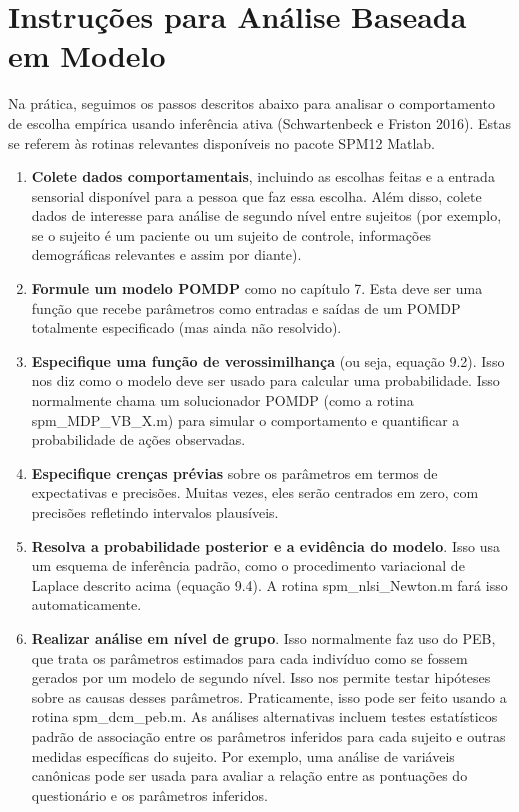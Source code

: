 \documentclass[
  12pt,
]{book}
\begin{document}
\hypertarget{instruuxe7uxf5es-para-anuxe1lise-baseada-em-modelo}{%
\section{Instruções para Análise Baseada em Modelo}\label{instruuxe7uxf5es-para-anuxe1lise-baseada-em-modelo}}

Na prática, seguimos os passos descritos abaixo para analisar o comportamento de escolha empírica usando inferência ativa (Schwartenbeck e Friston 2016). Estas se referem às rotinas relevantes disponíveis no pacote SPM12 Matlab.

\begin{enumerate}
\def\labelenumi{\arabic{enumi}.}
\item
  \textbf{Colete dados comportamentais}, incluindo as escolhas feitas e a entrada sensorial disponível para a pessoa que faz essa escolha. Além disso, colete dados de interesse para análise de segundo nível entre sujeitos (por exemplo, se o sujeito é um paciente ou um sujeito de controle, informações demográficas relevantes e assim por diante).
\item
  \textbf{Formule um modelo POMDP} como no capítulo 7. Esta deve ser uma função que recebe parâmetros como entradas e saídas de um POMDP totalmente especificado (mas ainda não resolvido).
\item
  \textbf{Especifique uma função de verossimilhança} (ou seja, equação 9.2). Isso nos diz como o modelo deve ser usado para calcular uma probabilidade. Isso normalmente chama um solucionador POMDP (como a rotina spm\_MDP\_VB\_X.m) para simular o comportamento e quantificar a probabilidade de ações observadas.
\item
  \textbf{Especifique crenças prévias} sobre os parâmetros em termos de expectativas e precisões. Muitas vezes, eles serão centrados em zero, com precisões refletindo intervalos plausíveis.
\item
  \textbf{Resolva a probabilidade posterior e a evidência do modelo}. Isso usa um esquema de inferência padrão, como o procedimento variacional de Laplace descrito acima (equação 9.4). A rotina spm\_nlsi\_Newton.m fará isso automaticamente.
\item
  \textbf{Realizar análise em nível de grupo}. Isso normalmente faz uso do PEB, que trata os parâmetros estimados para cada indivíduo como se fossem gerados por um modelo de segundo nível. Isso nos permite testar hipóteses sobre as causas desses parâmetros. Praticamente, isso pode ser feito usando a rotina spm\_dcm\_peb.m. As análises alternativas incluem testes estatísticos padrão de associação entre os parâmetros inferidos para cada sujeito e outras medidas específicas do sujeito. Por exemplo, uma análise de variáveis canônicas pode ser usada para avaliar a relação entre as pontuações do questionário e os parâmetros inferidos.
\end{enumerate}
\end{document}
